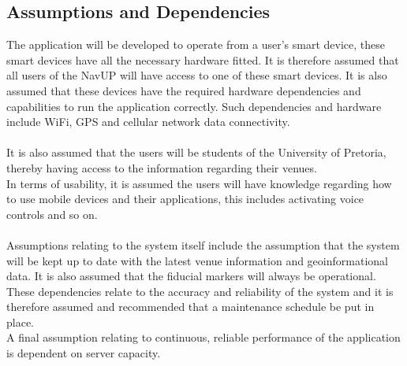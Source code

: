 	
	\subsection{Assumptions and Dependencies}
		The application will be developed to operate from a user's smart device, these smart devices have all the necessary hardware fitted. It is therefore assumed that all users of the NavUP will have access to one of these smart devices. It is also assumed that these devices have the required hardware dependencies and capabilities to run the application correctly. Such dependencies and hardware include WiFi, GPS and cellular network data connectivity.\\ \\
		It is also assumed that the users will be students of the University of Pretoria, thereby having access to the information regarding their venues.\\
		In terms of usability, it is assumed the users will have knowledge regarding how to use mobile devices and their applications, this includes activating voice controls and so on. \\ \\
		Assumptions relating to the system itself include the assumption that the system will be kept up to date with the latest venue information and geoinformational data. It is also assumed that the fiducial markers will always be operational. These dependencies relate to the accuracy and reliability of the system and it is therefore assumed and recommended that a maintenance schedule be put in place.\\
		A final assumption relating to continuous, reliable performance of the application is dependent on server capacity.

